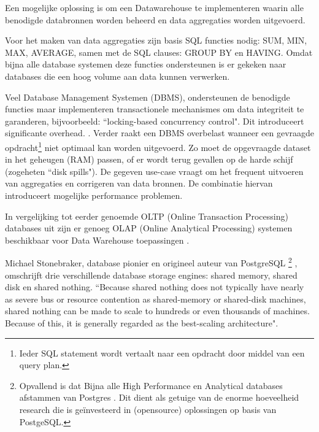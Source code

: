 Een mogelijke oplossing is om een Datawarehouse te implementeren waarin alle benodigde databronnen worden beheerd en data aggregaties worden uitgevoerd.

Voor het maken van data aggregaties zijn basis SQL functies nodig: SUM, MIN, MAX, AVERAGE, samen met de SQL clauses: GROUP BY en HAVING. \parencite{data-mining}
Omdat bijna alle database systemen deze functies ondersteunen is er gekeken naar databases die een hoog volume aan data kunnen verwerken.

Veel Database Management Systemen (DBMS), ondersteunen de benodigde functies maar implementeren transactionele mechanismes om data integriteit te garanderen, bijvoorbeeld: ``locking-based concurrency control". Dit introduceert significante overhead. \parencite{harizopoulos2008oltp}. Verder raakt een DBMS overbelast wanneer een gevraagde opdracht\footnote{ Ieder SQL statement wordt vertaalt naar een opdracht door middel van een query plan.} niet optimaal kan worden uitgevoerd. Zo moet de opgevraagde dataset in het geheugen (RAM) passen, of er wordt terug gevallen op de harde schijf (zogeheten ``disk spills"). De gegeven use-case vraagt om het frequent uitvoeren van aggregaties en corrigeren van data bronnen. De combinatie hiervan introduceert mogelijke performance problemen. \parencite{kersten2011researcher}


In vergelijking tot eerder genoemde OLTP (Online Transaction Processing) databases uit \textcite{kersten2011researcher} zijn er genoeg OLAP (Online Analytical Processing) systemen beschikbaar voor Data Warehouse toepassingen \parencite{data-mining}.


Michael Stonebraker, database pionier en origineel auteur van PostgreSQL
\footnote{
 Opvallend is dat Bijna alle High Performance en Analytical databases afstammen van Postgres \parencite{postgresforks}. Dit dient als getuige van de enorme hoeveelheid research die is geïnvesteerd in (opensource) oplossingen op basis van PostgeSQL.
}
, omschrijft drie verschillende database storage engines: shared memory, shared disk en shared nothing. ``Because shared nothing does not typically have nearly as severe bus or resource contention as shared-memory or shared-disk machines, shared nothing can be made to scale to hundreds or even thousands of machines. Because of this, it is generally regarded as the best-scaling architecture". \parencite{dewitt2006build}


